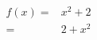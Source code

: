 \documentclass[10pt]{book}
\begin{document}
	\begin{align*}
		f(x) =& x^2+2\\
			 =& 2+x^2
	\end{align*}
\end{document}
